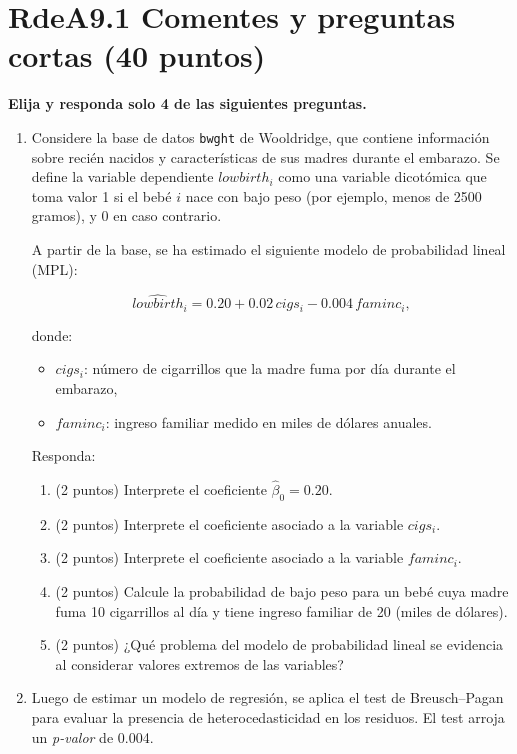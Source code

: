 \documentclass[10pt,a4paper]{article}
\begin{document}
\section{RdeA9.1 Comentes y preguntas cortas (40 puntos)}
{\bf Elija y responda solo 4 de las siguientes preguntas.}
\begin{enumerate}
    \item Considere la base de datos \texttt{bwght} de Wooldridge, que contiene información sobre recién nacidos
y características de sus madres durante el embarazo. Se define la variable dependiente
$lowbirth_i$ como una variable dicotómica que toma valor 1 si el bebé $i$ nace con bajo peso
(por ejemplo, menos de 2500 gramos), y 0 en caso contrario.

A partir de la base, se ha estimado el siguiente modelo de probabilidad lineal (MPL):

\[
\widehat{lowbirth}_i
= 0.20 + 0.02\, cigs_i - 0.004\, faminc_i,
\]

donde:
\begin{itemize}
    \item $cigs_i$: número de cigarrillos que la madre fuma por día durante el embarazo,
    \item $faminc_i$: ingreso familiar medido en miles de dólares anuales.
\end{itemize}

Responda:

\begin{enumerate}
    \item (2 puntos) Interprete el coeficiente $\hat\beta_0 = 0.20$.  
    \item (2 puntos) Interprete el coeficiente asociado a la variable $cigs_i$.
    \item (2 puntos) Interprete el coeficiente asociado a la variable $faminc_i$.
    \item (2 puntos)  Calcule la probabilidad de bajo peso para un bebé cuya madre fuma 10 cigarrillos al día y tiene ingreso familiar de 20 (miles de dólares).
    \item (2 puntos)  ¿Qué problema del modelo de probabilidad lineal se evidencia al considerar valores extremos de las variables?


\end{enumerate}
    \item Luego de estimar un modelo de regresión, se aplica el test de Breusch--Pagan para evaluar la presencia de heterocedasticidad en los residuos. El test arroja un \textit{p-valor} de 0.004.


\end{enumerate}
\end{document}
